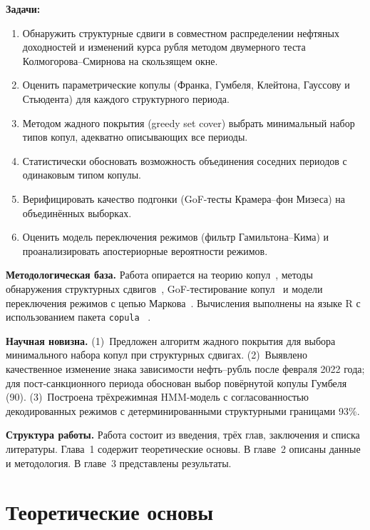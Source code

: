 \textbf{Задачи:}
\begin{enumerate}
  \item Обнаружить структурные сдвиги в совместном распределении нефтяных
        доходностей и изменений курса рубля методом двумерного теста
        Колмогорова--Смирнова на скользящем окне.
  \item Оценить параметрические копулы (Франка, Гумбеля, Клейтона,
        Гауссову и Стьюдента) для каждого структурного периода.
  \item Методом жадного покрытия (greedy set cover) выбрать минимальный
        набор типов копул, адекватно описывающих все периоды.
  \item Статистически обосновать возможность объединения соседних периодов
        с одинаковым типом копулы.
  \item Верифицировать качество подгонки (GoF-тесты Крамера--фон Мизеса)
        на объединённых выборках.
  \item Оценить модель переключения режимов (фильтр Гамильтона--Кима)
        и проанализировать апостериорные вероятности режимов.
\end{enumerate}

\textbf{Методологическая база.}
Работа опирается на теорию копул~\autocite{Nelsen2006, Joe2014},
методы обнаружения структурных сдвигов~\autocite{GenestNeslehovaQuessy2012},
GoF-тестирование копул~\autocite{GenestRemillard2008} и модели переключения
режимов с цепью Маркова~\autocite{Hamilton1989, Kim1994}.
Вычисления выполнены на языке R с использованием пакета \texttt{copula}
~\autocite{Kojadinovic2011}.

\textbf{Научная новизна.}
(1)~Предложен алгоритм жадного покрытия для выбора минимального набора
копул при структурных сдвигах.
(2)~Выявлено качественное изменение знака зависимости нефть--рубль
после февраля 2022 года; для пост-санкционного периода обоснован
выбор повёрнутой копулы Гумбеля (90\textdegree).
(3)~Построена трёхрежимная HMM-модель с согласованностью
декодированных режимов с детерминированными структурными границами 93\%.

\textbf{Структура работы.}
Работа состоит из введения, трёх глав, заключения и списка литературы.
Глава~1 содержит теоретические основы.
В главе~2 описаны данные и методология.
В главе~3 представлены результаты.


\chapter{Теоретические основы}


